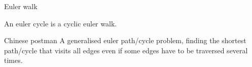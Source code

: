
\begin{algorithm}{Euler walk}

\desc
An euler cycle is a cyclic euler walk.
\end{algorithm}

\begin{algorithm}{Chinese postman}
\desc
A generalised euler path/cycle problem, finding the shortest path/cycle that
visits all edges even if some edges have to be traversed several times.
\end{algorithm}
